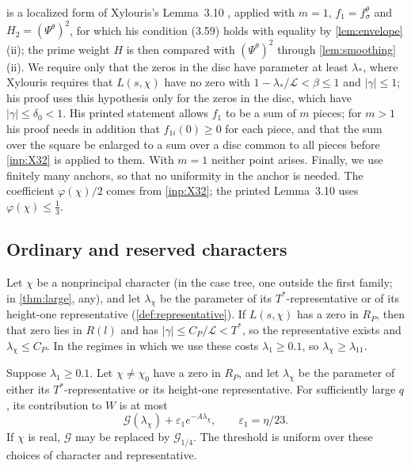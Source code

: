 \documentclass[11pt]{amsart}
\numberwithin{equation}{section}
\theoremstyle{plain}
\theoremstyle{definition}
\theoremstyle{remark}
\newcommand{\LL}{\mathcal{L}}
\newcommand{\eps}{\varepsilon}
\newcommand{\1}{\mathbf{1}}
\begin{document}
\begin{remark}\label{rem:lemma310}
 is a localized form of Xylouris's Lemma~3.10 \cite[pp.~35--36]{Xylouris2011nullstellen},
applied with $m=1$, $f_1=f^\theta_\sigma$ and $H_2=(\Psi^\theta)^2$, for which his condition (3.59) holds
with equality by \cref{lem:envelope}(ii); the prime weight $H$ is then compared with $(\Psi^\theta)^2$
through \cref{lem:smoothing}(ii). We require only that the zeros in the disc have parameter at least
$\lambda_*$, where Xylouris requires that $L(s,\chi)$ have no zero with $1-\lambda_*/\LL<\beta\le1$ and
$|\gamma|\le1$; his proof uses this hypothesis only for the zeros in the disc, which have
$|\gamma|\le\delta_0<1$. His printed statement allows $f_1$ to be a sum of $m$ pieces; for $m>1$ his proof
needs in addition that $f_{1i}(0)\ge0$ for each piece, and that the sum over the square be enlarged to
a sum over a disc common to all pieces before \cref{inp:X32} is applied to them. With $m=1$ neither
point arises. Finally, we use finitely many anchors, so that no uniformity in the anchor is needed.
The coefficient $\varphi(\chi)/2$ comes from \cref{inp:X32}; the printed Lemma~3.10 uses
$\varphi(\chi)\le\frac13$.
\end{remark}

\subsection{Ordinary and reserved characters}\label{subsec:ordinarycost}
Let $\chi$ be a nonprincipal character (in the case tree, one outside the first family; in
\cref{thm:large}, any), and let $\lambda_\chi$ be the parameter of its $T^*$-representative or of its
height-one representative (\cref{def:representative}). If $L(s,\chi)$ has a zero in $R_P$, then that zero lies in $R(l)$ and
has $|\gamma|\le C_P/\LL<T^*$, so the representative exists and $\lambda_\chi\le C_P$. In the regimes
in which we use these costs $\lambda_1\ge0.1$, so $\lambda_\chi\ge\lambda_{11}$.

\begin{corollary}\label{cor:ordinarycost}
Suppose $\lambda_1\ge0.1$. Let $\chi\ne\chi_0$ have a zero in $R_P$, and let
$\lambda_\chi$ be the parameter of either its $T^*$-representative or its height-one
representative. For sufficiently large $q$, its contribution to $W$ is at most
\[
  \mathcal G(\lambda_\chi)+\eps_1e^{-A\lambda_\chi},\qquad \eps_1=\eta/23.
\]
If $\chi$ is real, $\mathcal G$ may be replaced by $\mathcal G_{1/4}$.
The threshold is uniform over these choices of character and representative.
\end{corollary}
\end{document}
